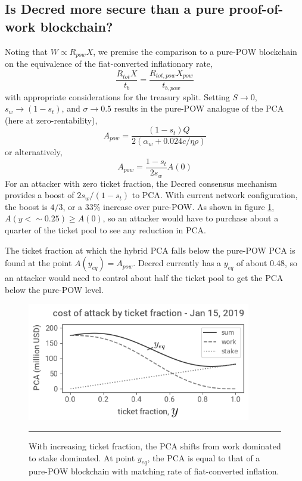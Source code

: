 \documentclass[a4paper,12pt]{article}
\begin{document}
\subsection{Is Decred more secure than a pure proof-of-work blockchain?}

Noting that $W \propto R_{pow} X $, we premise the comparison to a pure-POW blockchain on the equivalence of the fiat-converted inflationary rate,
%
\begin{equation}
\frac{  R_{tot} X }{ t_b } = \frac{ R_{tot, pow} X_{pow} }{ t_{b, pow} }
\end{equation}
%
with appropriate considerations for the treasury split. Setting $ S \rightarrow 0 $, $ s_w \rightarrow (1 - s_t)  $,  and $ \sigma \rightarrow 0.5 $ results in the pure-POW analogue of the PCA (here at zero-rentability),
%
\begin{equation}
\label{ purepow }
A_{ pow } = \frac{ (1 - s_t) Q }{ 2 (\alpha_w + 0.024 c / \eta\rho) }
\end{equation}
%
or alternatively, 
%
\begin{equation}
A_{ pow } = \frac{ 1 - s_t }{ 2 s_w } A(0)
\end{equation}
%
For an attacker with zero ticket fraction, the Decred consensus mechanism provides a boost of $ 2 s_w / ( 1 - s_t ) $ to PCA. With current network configuration, the boost is $ 4 / 3 $, or a 33\% increase over pure-POW. As shown in figure \ref{ycont}, $ A(y < \sim 0.25) \ge A(0) $, so an attacker would have to purchase about a quarter of the ticket pool to see any reduction in PCA. 

The ticket fraction at which the hybrid PCA falls below the pure-POW PCA is found at the point $ A(y_{eq}) = A_{pow} $. Decred currently has a $ y_{eq} $ of about 0.48, so an attacker would need to control about half the ticket pool to get the PCA below the pure-POW level. 
%
\begin{figure}[h!]
	\begin{center}
	\includegraphics[width=3.84in]{y-contributions}
\begin{minipage}[t]{0.85\textwidth}
	\caption{With increasing ticket fraction, the PCA shifts from work dominated to stake dominated. At point $ y_{eq} $, the PCA is equal to that of a pure-POW blockchain with matching rate of fiat-converted inflation. \label{ycont}}
	\end{minipage}
  	\end{center}
	\hrule
	\vspace{5pt}
\end{figure}
%
\end{document}

